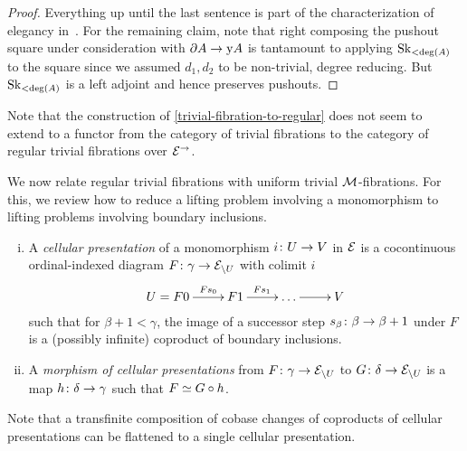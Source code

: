 \documentclass[reqno,10pt,a4paper,oneside,draft]{amsart}
\begin{document}
\begin{proof}
Everything up until the last sentence is part of the characterization of elegancy in~\cite[Proposition~3.8]{bergner-rezk-elegant}.
For the remaining claim, note that right composing the pushout square under consideration with $\partial A \to \yon A$ is tantamount to applying $\Sk_{<\deg(A)}$ to the square since we assumed $d_1, d_2$ to be non-trivial, \ie degree reducing.
But $\Sk_{<\deg(A)}$ is a left adjoint and hence preserves pushouts.
\end{proof}

Note that the construction of \cref{trivial-fibration-to-regular} does not seem to extend to a functor from the category of trivial fibrations to the category of regular trivial fibrations over $\catE^{\to}$.

\medskip

We now relate regular trivial fibrations with uniform trivial $\cal{M}$-fibrations.
For this, we review how to reduce a lifting problem involving a monomorphism to lifting problems involving boundary inclusions.

\begin{definition} \hfill
\begin{enumerate}[(i)]
\item A \emph{cellular presentation} of a monomorphism $i \co U \to V$ in $\catE$ is a cocontinuous ordinal-indexed diagram $F \co \gamma \to \catE_{\backslash U}$ with colimit $i$
\[
\xymatrix{
  U = F 0
  \ar[r]^-{F s_0}
&
  F 1
  \ar[r]^{F s_1}
&
  \ldots
  \ar[r]
&
  V
}
\]
such that for $\beta + 1 < \gamma$, the image of a successor step $s_{\beta} \co \beta \to \beta + 1$ under $F$ is a (possibly infinite) coproduct of boundary inclusions.
\item A \emph{morphism of cellular presentations} from $F \co \gamma \to \cal{E}_{\backslash U}$ to $G \co \delta \to \cal{E}_{\backslash U}$ is a map $h \co \delta \to \gamma$ such that $F \simeq G \cc h$.
\end{enumerate}
\end{definition}

Note that a transfinite composition of cobase changes of coproducts of cellular presentations can be flattened to a single cellular presentation.
\end{document}
